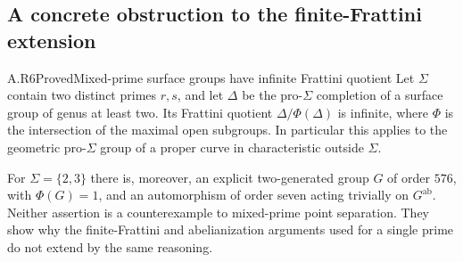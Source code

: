 \subsection{A concrete obstruction to the finite-Frattini extension}

\begin{claim}{A.R6}{Proved}{Mixed-prime surface groups have infinite Frattini quotient}
Let $\Sigma$ contain two distinct primes $r,s$, and let $\Delta$
be the pro-$\Sigma$ completion of a surface group of genus at least
two. Its Frattini quotient $\Delta/\Phi(\Delta)$ is infinite,
where $\Phi$ is the intersection of the maximal open subgroups.
In particular this applies to the geometric pro-$\Sigma$ group
of a proper curve in characteristic outside $\Sigma$.

For $\Sigma=\{2,3\}$ there is, moreover, an explicit two-generated
group $G$ of order $576$, with $\Phi(G)=1$, and an automorphism of
order seven acting trivially on $G^{\mathrm{ab}}$.
Neither assertion is a counterexample to mixed-prime point separation.
They show why the finite-Frattini and abelianization arguments used
for a single prime do not extend by the same reasoning.
\end{claim}
